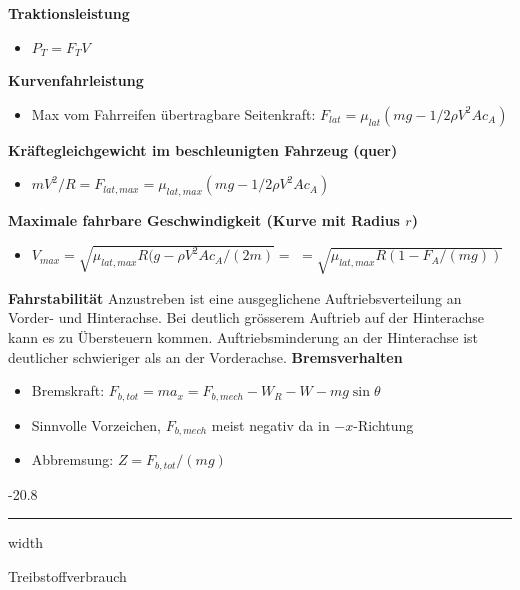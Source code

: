 \documentclass[8pt, landscape, fleqn]{scrartcl}
\makeatletter
\renewcommand{\subsubsection}{\@startsection{subsubsection}{1}{0mm}%
{-2\baselineskip}{0.8\baselineskip}%
{\hrule depth 0.2pt width\columnwidth\vspace*{1.2em}\normalsize\bfseries\rmfamily}}
\makeatother
\begin{document}
\begin{multicols*}{3}
\textbf{Traktionsleistung}

\begin{itemize}
    \item $P_T = F_T V$
\end{itemize}

\textbf{Kurvenfahrleistung}

\begin{itemize}
    \item Max vom Fahrreifen übertragbare Seitenkraft: \newline $F_{lat} = \mu_{lat}(mg - 1/2 \rho V^2A c_A)$
\end{itemize}

\textbf{Kräftegleichgewicht im beschleunigten Fahrzeug (quer)} 

\begin{itemize}
    \item $mV^2 / R = F_{lat,max} = \mu_{lat,max}(mg- 1/2 \rho V^2 A c_A)$
\end{itemize}

\textbf{Maximale fahrbare Geschwindigkeit (Kurve mit Radius $r$)}

\begin{itemize}
    \item $V_{max} = \sqrt{\mu_{lat,max} R(g-\rho V^2Ac_A/(2m)} =$ \newline $= \sqrt{\mu_{lat,max} R(1-F_A/(mg))}$
\end{itemize}

\textbf{Fahrstabilität}
\newline \newline
Anzustreben ist eine ausgeglichene Auftriebsverteilung an Vorder- und Hinterachse. Bei deutlich grösserem Auftrieb auf der Hinterachse
kann es zu Übersteuern kommen. Auftriebsminderung an der Hinterachse ist deutlicher schwieriger als an der Vorderachse.
\newline \newline
\textbf{Bremsverhalten}

\begin{itemize}
    \item Bremskraft: \newline $F_{b,tot} = ma_x = F_{b,mech} - W_R - W - mg \sin{\theta}$
    \item Sinnvolle Vorzeichen, $F_{b,mech}$ meist negativ da in $-x$-Richtung
    \item Abbremsung: $Z = F_{b,tot} / (mg)$
\end{itemize}

\subsubsection{Treibstoffverbrauch}


\end{multicols*}
\end{document}
